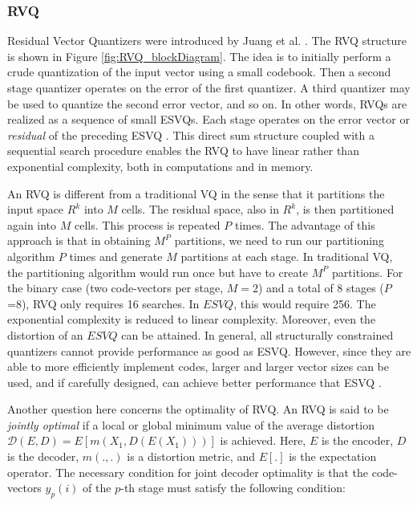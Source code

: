 \documentclass[12pt,letterpaper,doublespaced,ETD,proposal]{gt-ece-thesis}
\begin{document}
\begin{Body}
\subsubsection{RVQ}
Residual Vector Quantizers were introduced by Juang et al. \cite{1982_CNF_SpeechRVQ_JuangGray}.  The RVQ structure is shown in Figure \ref{fig:RVQ_blockDiagram}.  The idea is to initially perform a crude quantization of the input vector using a small codebook.  Then a second stage quantizer operates on the error of the first quantizer.  A third quantizer may be used to quantize the second error vector, and so on.  In other words, RVQs are realized as a sequence of small ESVQs.  Each stage operates on the error vector or \emph{residual} of the preceding ESVQ \cite{1991_CNF_DesignPerformanceRVQ_Frost}.  This direct sum structure coupled with a sequential search procedure enables the RVQ to have linear rather than exponential complexity, both in computations and in memory.  

An RVQ is different from a traditional VQ in the sense that it partitions the input space $R^k$ into $M$ cells.  The residual space, also in $R^k$, is then partitioned again into $M$ cells.  This process is repeated $P$ times.  The advantage of this approach is that in obtaining $M^P$ partitions, we need to run our partitioning algorithm $P$ times and generate $M$ partitions at each stage.  In traditional VQ, the partitioning algorithm would run once but have to create $M^P$ partitions.  For the binary case (two code-vectors per stage, $M=2$) and a total of 8 stages ($P$=8), RVQ only requires 16 searches.  In $ESVQ$, this would require 256.  The exponential complexity is reduced to linear complexity.  Moreover, even the distortion of an $ESVQ$ can be attained.  In general, all structurally constrained quantizers cannot provide performance as good as ESVQ.  However, since they are able to more efficiently implement codes, larger and larger vector sizes can be used, and if carefully designed, can achieve better performance that ESVQ \cite{1996_JNL_AdvancesRVQ_Barnes}.

Another question here concerns the optimality of RVQ.  An RVQ is said to be \emph{jointly optimal} if a local or global minimum value of the average distortion $\mathcal{D}(E,D) = E[m(X_1, D(E(X_1)))]$ is achieved.  Here, $E$ is the encoder, $D$ is the decoder, $m(.,.)$ is a distortion metric, and $E[.]$ is the expectation operator.  The necessary condition for joint decoder optimality is that the code-vectors $y_p(i)$  of the $p$-th stage must satisfy the following condition:


\end{Body}
\end{document}
